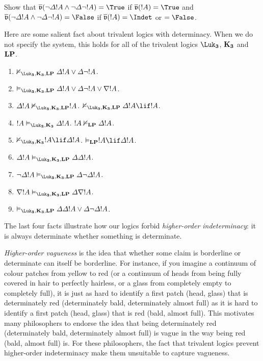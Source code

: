 \documentclass[../../../include/open-logic-section]{subfiles}
\begin{document}
\begin{prob}
  Show that $\pValue{v}(\lnot \Delta !A \land \lnot \Delta \lnot !A)= \True$ if $\pValue{v}(!A)= \True$ and $\pValue{v}(\lnot \Delta !A \land \lnot \Delta \lnot !A)= \False$ if $\pValue{v}(!A)= \Indet$ or $= \False$.
\end{prob}

Here are some salient fact about trivalent logics with determinacy. When we do not specify the system, this holds for all of the trivalent logics $\Log{\Luk_3}$, $\Log{K_3}$ and $\Log{LP}$.

\begin{prop}
\begin{enumerate}
  \item $\Entails/[\Log{\Luk_3,K_3,LP}] \Delta !A \lor \Delta \lnot !A$.
  \item $\Entails[\Log{\Luk_3,K_3,LP}] \Delta !A \lor \Delta \lnot !A \lor \nabla !A$.
  \item $\Delta !A \Entails/[\Log{\Luk_3,K_3,LP}] !A$. $\Entails/[\Log{\Luk_3,K_3,LP}] \Delta !A \lif !A$.
  \item $!A \Entails[\Log{\Luk_3,K_3}] \Delta !A$. $!A \Entails/[\Log{LP}] \Delta !A$.
  \item $\Entails/[\Log{\Luk_3,K_3}] !A \lif \Delta !A$. $\Entails[\Log{LP}] !A \lif \Delta !A$.
  \item $\Delta !A \Entails[\Log{\Luk_3,K_3,LP}] \Delta \Delta !A$.
  \item $\lnot \Delta !A \Entails[\Log{\Luk_3,K_3,LP}] \Delta \lnot \Delta !A$.
  \item $\nabla !A \Entails[\Log{\Luk_3,K_3,LP}] \Delta \nabla !A$.
  \item $\Entails[\Log{\Luk_3,K_3,LP}] \Delta \Delta !A \lor \Delta \lnot \Delta !A$.  
\end{enumerate}
\end{prop}

The last four facts illustrate how our logics forbid \emph{higher-order indeterminacy}: it is always determinate whether something is determinate. 

\begin{digress}
\emph{Higher-order vagueness} is the idea that whether some claim is borderline or determinate can itself be borderline. For instance, if you imagine a continuum of colour patches from yellow to red (or a continuum of heads from being fully covered in hair to perfectly hairless, or a glass from completely empty to completely full), it is just as hard to identify a first patch (head, glass) that is determinately red (determinately bald, determinately almost full) as it is hard to identify a first patch (head, glass) that is red (bald, almost full). This motivates many philosophers to endorse the idea that being determinately red (determinately bald, determinately almost full) is vague in the way being red (bald, almost full) is. For these philosophers, the fact that trivalent logics prevent higher-order indeterminacy make them unsuitable to capture vagueness. 
\end{digress}
\end{document}
